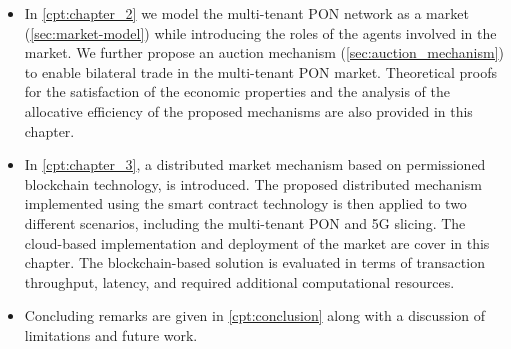 \begin{itemize}
    
    \item In \autoref{cpt:chapter_2} we model the multi-tenant \ac{PON} network as a market (\autoref{sec:market-model}) while introducing the roles of the agents involved in the market. We further propose an auction mechanism (\autoref{sec:auction_mechanism}) to enable bilateral trade in the multi-tenant \ac{PON} market. Theoretical proofs for the satisfaction of the economic properties and the analysis of the allocative efficiency of the proposed mechanisms are also provided in this chapter.
    \item In \autoref{cpt:chapter_3}, a distributed market mechanism based on permissioned blockchain technology, is introduced. The proposed distributed mechanism implemented using the smart contract technology is then applied to two different scenarios, including the multi-tenant \ac{PON} and \ac{5G} slicing. The cloud-based implementation and deployment of the market are cover in this chapter. The blockchain-based solution is evaluated in terms of transaction throughput, latency, and required additional computational resources.
    
    
    
    \item Concluding remarks are given in \autoref{cpt:conclusion} along with a discussion of limitations and future work.
    
    
    
    \end{itemize}



